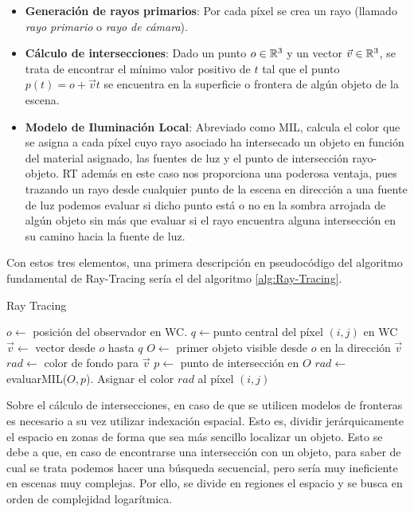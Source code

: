 \begin{itemize}
    \item \textbf{Generación de rayos primarios}: Por cada píxel se crea un rayo (llamado \textit{rayo primario} o \textit{rayo de cámara}).
    \item \textbf{Cálculo de intersecciones}: Dado un punto $o\in\mathbb{R}^3$ y un vector $\vec v\in\mathbb{R}^3$, se trata de encontrar el mínimo valor positivo de $t$ tal que el punto $p(t)=o+\vec v t$ se encuentra en la superficie o frontera de algún objeto de la escena.
    \item \textbf{Modelo de Iluminación Local}: Abreviado como MIL, calcula el color que se asigna a cada píxel cuyo rayo asociado ha intersecado un objeto en función del material asignado, las fuentes de luz y el punto de intersección rayo-objeto. RT además en este caso nos proporciona una poderosa ventaja, pues trazando un rayo desde cualquier punto de la escena en dirección a una fuente de luz podemos evaluar si dicho punto está o no en la sombra arrojada de algún objeto sin más que evaluar si el rayo encuentra alguna intersección en su camino hacia la fuente de luz.
\end{itemize}

Con estos tres elementos, una primera descripción en pseudocódigo del algoritmo fundamental de Ray-Tracing sería el del algoritmo \ref{alg:Ray-Tracing}.

\begin{algorithm}[!]
    \caption{Ray Tracing} \label{alg:Ray-Tracing}
    \begin{algorithmic}
        \State $o\gets$ posición del observador en WC.
            \State $q\gets$punto central del píxel $(i,j)$ en WC
            \State $\vec v\gets$ vector desde $o$ hasta $q$
            \State $O\gets$ primer objeto visible desde $o$ en la dirección $\vec v$
                \State $rad\gets$ color de fondo para $\vec v$ 
            \Else
                \State $p\gets$ punto de intersección en $O$
                \State $rad\gets$ evaluarMIL($O,p$).
            \EndIf
            \State Asignar el color $rad$ al píxel $(i,j)$
        \EndFor
    \end{algorithmic}
\end{algorithm}

Sobre el cálculo de intersecciones, en caso de que se utilicen modelos de fronteras es necesario a su vez utilizar indexación espacial. Esto es, dividir jerárquicamente el espacio en zonas de forma que sea más sencillo localizar un objeto. Esto se debe a que, en caso de encontrarse una intersección con un objeto, para saber de cual se trata podemos hacer una búsqueda secuencial, pero sería muy ineficiente en escenas muy complejas. Por ello, se divide en regiones el espacio y se busca en orden de complejidad logarítmica.

